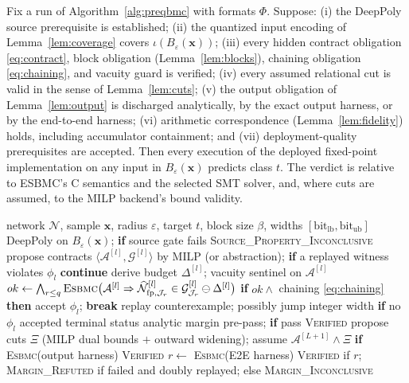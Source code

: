 \begin{theorem}
\label{thm:sound}
Fix a run of Algorithm~\ref{alg:preqbmc} with formats $\Phi$. Suppose:
(i) the DeepPoly source prerequisite is established;
(ii) the quantized input encoding of Lemma~\ref{lem:coverage} covers
$\iota(B_\varepsilon(\mathbf{x}))$;
(iii) every hidden contract obligation \eqref{eq:contract}, block
obligation (Lemma~\ref{lem:blocks}), chaining obligation
\eqref{eq:chaining}, and vacuity guard is verified;
(iv) every assumed relational cut is valid in the sense of
Lemma~\ref{lem:cuts};
(v) the output obligation of Lemma~\ref{lem:output} is discharged
analytically, by the exact output harness, or by the end-to-end
harness;
(vi) arithmetic correspondence (Lemma~\ref{lem:fidelity}) holds,
including accumulator containment; and
(vii) deployment-quality prerequisites are accepted.
Then every execution of the deployed fixed-point implementation on any
input in $B_\varepsilon(\mathbf{x})$ predicts class $t$. The verdict is
relative to ESBMC's C semantics and the selected SMT solver, and, where
cuts are assumed, to the MILP backend's bound validity.
\end{theorem}
 
\begin{algorithm}[t]
\caption{PreQ-BMC synthesis and verification (layer-contract mode)}
\label{alg:preqbmc}
\small
\begin{algorithmic}[1]
\Require network $\mathcal{N}$, sample $\mathbf{x}$, radius $\varepsilon$, target $t$, block size $\beta$, widths $[\mathrm{bit}_{\mathrm{lb}},\mathrm{bit}_{\mathrm{ub}}]$
\State DeepPoly on $B_\varepsilon(\mathbf{x})$; \textbf{if} source gate fails \Return \textsc{Source\_Property\_Inconclusive}
\State propose contracts $\langle\mathcal{A}^{[l]},\mathcal{G}^{[l]}\rangle$ by MILP (or abstraction); 
    \State \textbf{if} a replayed witness violates $\phi_l$ \textbf{continue} 
    \State derive budget $\Delta^{[l]}$; vacuity sentinel on $\mathcal{A}^{[l]}$
    \State $ok \gets \bigwedge_{r\le q}\textsc{Esbmc}\bigl(\mathcal{A}^{[l]} \Rightarrow \widehat{\mathcal{N}}^{[l]}_{\mathrm{fp},\mathcal{J}_r} \in \mathcal{G}^{[l]}_{\mathcal{J}_r}\ominus\Delta^{[l]}\bigr)$ 
    \State \textbf{if} $ok \wedge$ chaining \eqref{eq:chaining} \textbf{then} accept $\phi_l$; \textbf{break}
    \State replay counterexample; possibly jump integer width 
  \EndFor
  \State \textbf{if} no $\phi_l$ accepted \Return terminal status
\EndFor
\State analytic margin pre-pass; \textbf{if} pass \Return \textsc{Verified}
\State propose cuts $\Xi$ (MILP dual bounds $+$ outward widening); assume $\mathcal{A}^{[L+1]}\wedge\Xi$
\State \textbf{if} \textsc{Esbmc}(output harness) \Return \textsc{Verified}
\State $r \gets$ \textsc{Esbmc}(E2E harness) 
\State \Return \textsc{Verified} if $r$; \textsc{Margin\_Refuted} if failed and doubly replayed; else \textsc{Margin\_Inconclusive}
\end{algorithmic}
\end{algorithm}
 
